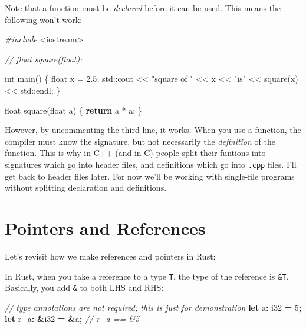 \documentclass[
]{book}
\newenvironment{Shaded}{\begin{snugshade}}{\end{snugshade}}
\newcommand{\BuiltInTok}[1]{#1}
\newcommand{\CommentTok}[1]{\textcolor[rgb]{0.56,0.35,0.01}{\textit{#1}}}
\newcommand{\ControlFlowTok}[1]{\textcolor[rgb]{0.13,0.29,0.53}{\textbf{#1}}}
\newcommand{\DataTypeTok}[1]{\textcolor[rgb]{0.13,0.29,0.53}{#1}}
\newcommand{\DecValTok}[1]{\textcolor[rgb]{0.00,0.00,0.81}{#1}}
\newcommand{\FloatTok}[1]{\textcolor[rgb]{0.00,0.00,0.81}{#1}}
\newcommand{\ImportTok}[1]{#1}
\newcommand{\KeywordTok}[1]{\textcolor[rgb]{0.13,0.29,0.53}{\textbf{#1}}}
\newcommand{\NormalTok}[1]{#1}
\newcommand{\OperatorTok}[1]{\textcolor[rgb]{0.81,0.36,0.00}{\textbf{#1}}}
\newcommand{\PreprocessorTok}[1]{\textcolor[rgb]{0.56,0.35,0.01}{\textit{#1}}}
\newcommand{\StringTok}[1]{\textcolor[rgb]{0.31,0.60,0.02}{#1}}
\begin{document}
Note that a function must be \emph{declared} before it can be used. This means the following won't work:

\begin{Shaded}
\begin{Highlighting}[]
\PreprocessorTok{\#include }\ImportTok{\textless{}iostream\textgreater{}}

\CommentTok{// float square(float);}

\DataTypeTok{int}\NormalTok{ main()}
\NormalTok{\{}
    \DataTypeTok{float}\NormalTok{ x = }\FloatTok{2.5}\NormalTok{;}
    \BuiltInTok{std::}\NormalTok{cout \textless{}\textless{} }\StringTok{"square of "}\NormalTok{ \textless{}\textless{} x \textless{}\textless{} }\StringTok{"is"}\NormalTok{ \textless{}\textless{} square(x) \textless{}\textless{} }\BuiltInTok{std::}\NormalTok{endl;}
\NormalTok{\}}


\DataTypeTok{float}\NormalTok{ square(}\DataTypeTok{float}\NormalTok{ a)}
\NormalTok{\{}
    \ControlFlowTok{return}\NormalTok{ a * a;}
\NormalTok{\}}
\end{Highlighting}
\end{Shaded}

However, by uncommenting the third line, it works. When you use a function, the compiler must know the signature, but not necessarily the \emph{definition} of the function. This is why in C++ (and in C) people split their funtions into signatures which go into header files, and definitions which go into \texttt{.cpp} files. I'll get back to header files later. For now we'll be working with single-file programs without splitting declaration and definitions.

\hypertarget{pointers-and-references}{%
\section{Pointers and References}\label{pointers-and-references}}

Let's revisit how we make references and pointers in Rust:

In Rust, when you take a reference to a type \texttt{T}, the type of the reference is \texttt{\&T}. Basically, you add \texttt{\&} to both LHS and RHS:

\begin{Shaded}
\begin{Highlighting}[]
\CommentTok{// type annotations are not required; this is just for demonstration}
\KeywordTok{let}\NormalTok{   a}\OperatorTok{:}  \DataTypeTok{i32} \OperatorTok{=}  \DecValTok{5}\OperatorTok{;}
\KeywordTok{let}\NormalTok{ r\_a}\OperatorTok{:} \OperatorTok{\&}\DataTypeTok{i32} \OperatorTok{=} \OperatorTok{\&}\NormalTok{a}\OperatorTok{;} \CommentTok{// r\_a == \&5}
\end{Highlighting}
\end{Shaded}
\end{document}
